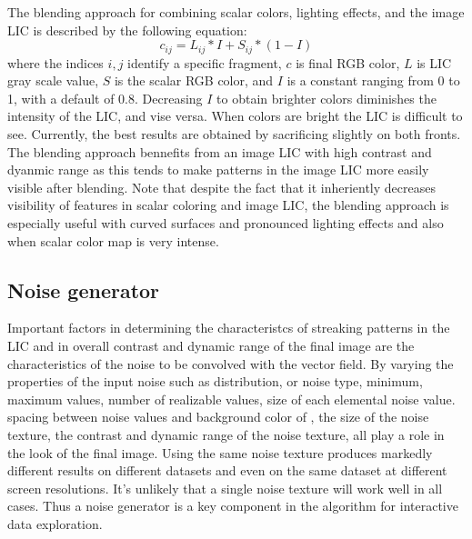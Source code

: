 \documentclass[a4paper,10pt]{article}
\begin{document}
The blending approach for combining scalar colors, lighting effects, and the image LIC is described by the following equation:
\begin{equation}
c_{ij} = L_{ij} * I + S_{ij} * (1 - I)
\label{eqn:color-blend}
\end{equation}
where the indices $i,j$ identify a specific fragment, $c$ is final RGB color, $L$ is LIC gray scale value, $S$ is the scalar RGB color, and $I$ is a constant ranging from 0 to 1, with a default of 0.8. Decreasing $I$ to obtain brighter colors diminishes the intensity of the LIC, and vise versa. When colors are bright the LIC is difficult to see. Currently, the best results are obtained by sacrificing slightly on both fronts. The blending approach bennefits from an image LIC with high contrast and dyanmic range as this tends to make patterns in the image LIC more easily visible after blending. Note that despite the fact that it inheriently decreases visibility of features in scalar coloring and image LIC, the blending approach is especially useful with curved surfaces and pronounced lighting effects and also when scalar color map is very intense.

\subsection{Noise generator}
Important factors in determining the characteristcs of streaking patterns in the LIC and in overall contrast and dynamic range of the final image are the characteristics of the noise to be convolved with the vector field. By varying the properties of the input noise such as distribution, or noise type, minimum, maximum values, number of realizable values, size of each elemental noise value.  spacing between noise values and background color of , the size of the noise texture, the contrast and dynamic range of the noise texture, all play a role in the look of the final image. Using the same noise texture produces markedly different results on different datasets and even on the same dataset at different screen resolutions. It's unlikely that a single noise texture will work well in all cases. Thus a noise generator is a key component in the algorithm for interactive data exploration. 
\end{document}
